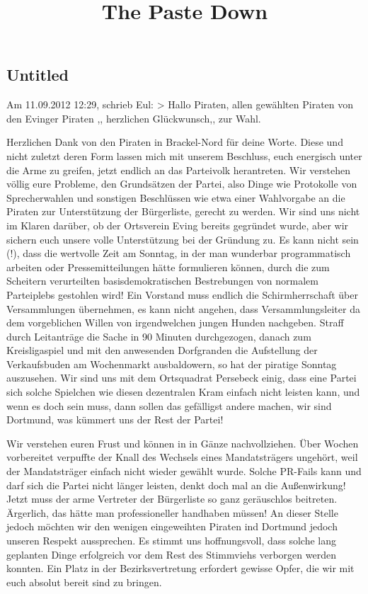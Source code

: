 \documentclass[a1paper]{article}
\title{The Paste Down}
\begin{document}
\maketitle

\thispagestyle{empty}
\pagestyle{empty}

\begin{multicols}{7}{







\section{Untitled}
Am 11.09.2012 12:29, schrieb Eul:
> Hallo Piraten, allen gewählten Piraten von den Evinger Piraten ,, herzlichen Glückwunsch,, zur Wahl.

Herzlichen Dank von den Piraten in Brackel-Nord für deine Worte. Diese und nicht zuletzt deren Form lassen mich mit unserem Beschluss, euch energisch unter die Arme zu greifen, jetzt endlich an das Parteivolk herantreten. Wir verstehen völlig eure Probleme, den Grundsätzen der Partei, also Dinge wie Protokolle von Sprecherwahlen und sonstigen Beschlüssen wie etwa einer Wahlvorgabe an die Piraten zur Unterstützung der Bürgerliste, gerecht zu werden. Wir sind uns nicht im Klaren darüber, ob der Ortsverein Eving bereits gegründet wurde, aber wir sichern euch unsere volle Unterstützung bei der Gründung zu. Es kann nicht sein (!), dass die wertvolle Zeit am Sonntag, in der man wunderbar programmatisch arbeiten oder Pressemitteilungen hätte formulieren können, durch die zum Scheitern verurteilten basisdemokratischen Bestrebungen von normalem Parteiplebs gestohlen wird! Ein Vorstand muss endlich die Schirmherrschaft über Versammlungen übernehmen, es kann nicht angehen, dass Versammlungsleiter da dem vorgeblichen Willen von irgendwelchen jungen Hunden nachgeben. Straff durch Leitanträge die Sache in 90 Minuten durchgezogen, danach zum Kreisligaspiel und mit den anwesenden Dorfgranden die Aufstellung der Verkaufsbuden am Wochenmarkt ausbaldowern, so hat der piratige Sonntag auszusehen. Wir sind uns mit dem Ortsquadrat Persebeck einig, dass eine Partei sich solche Spielchen wie diesen dezentralen Kram einfach nicht leisten kann, und wenn es doch sein muss, dann sollen das gefälligst andere machen, wir sind Dortmund, was kümmert uns der Rest der Partei!

Wir verstehen euren Frust und können in in Gänze nachvollziehen. Über Wochen vorbereitet verpuffte der Knall des Wechsels eines Mandatsträgers ungehört, weil der Mandatsträger einfach nicht wieder gewählt wurde. Solche PR-Fails kann und darf sich die Partei nicht länger leisten, denkt doch mal an die Außenwirkung! Jetzt muss der arme Vertreter der Bürgerliste so ganz geräuschlos beitreten. Ärgerlich, das hätte man professioneller handhaben müssen! An dieser Stelle jedoch möchten wir den wenigen eingeweihten Piraten ind Dortmund jedoch unseren Respekt aussprechen. Es stimmt uns hoffnungsvoll, dass solche lang geplanten Dinge erfolgreich vor dem Rest des Stimmviehs verborgen werden konnten. Ein Platz in der Bezirksvertretung erfordert gewisse Opfer, die wir mit euch absolut bereit sind zu bringen.

}
\end{multicols}
\end{document}
